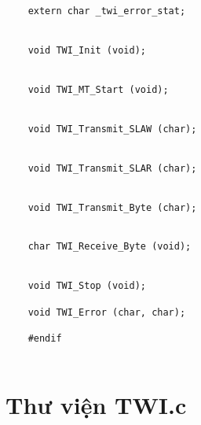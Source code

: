 \begin{lstlisting}
	 
	extern char _twi_error_stat;
	

	void TWI_Init (void);
	

	void TWI_MT_Start (void);
	

	void TWI_Transmit_SLAW (char);
	

	void TWI_Transmit_SLAR (char);
	

	void TWI_Transmit_Byte (char);
	

	char TWI_Receive_Byte (void);
	

	void TWI_Stop (void);

	void TWI_Error (char, char);
	
	#endif
	
\end{lstlisting}


\section{Thư viện TWI.c }

